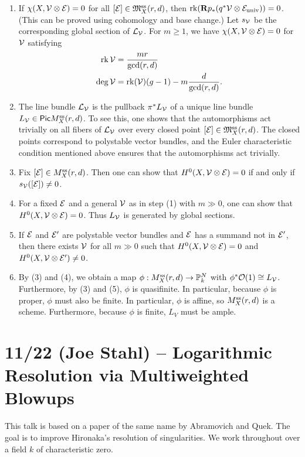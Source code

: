 \documentclass{amsart}
\begin{document}
\begin{enumerate}
	\item If $\chi(X, \mathcal{V} \otimes \mathcal{E}) = 0$ for all $[\mathcal{E}] \in \mathfrak{M}_X^{\mathrm{ss}}(r, d)$, then $\operatorname{rk} (\mathbf{R} p_* (q^* \mathcal{V} \otimes \mathcal{E}_{\mathrm{univ}})) = 0$.
		(This can be proved using cohomology and base change.)
		Let $s_{\mathcal{V}}$ be the corresponding global section of $\mathcal{L}_{\mathcal{V}}$.
		For $m \geq 1$, we have $\chi(X, \mathcal{V} \otimes \mathcal{E}) = 0$ for $\mathcal{V}$ satisfying
		\begin{align*}
			\operatorname{rk} \mathcal{V} &= \frac{m r}{\gcd(r, d)} \\
			\deg \mathcal{V} &= \operatorname{rk}(\mathcal{V}) (g - 1) - m \frac{d}{\gcd(r, d)}.
		\end{align*}
	\item The line bundle $\mathcal{L}_{\mathcal{V}}$ is the pullback $\pi^* L_{\mathcal{V}}$ of a unique line bundle $L_{\mathcal{V}} \in \mathsf{Pic} M_X^{\mathrm{ss}}(r, d)$.
		To see this, one shows that the automorphisms act trivially on all fibers of $\mathcal{L}_{\mathcal{V}}$ over every closed point $[\mathcal{E}] \in \mathfrak{M}_X^{\mathrm{ss}}(r, d)$.
		The closed points correspond to polystable vector bundles, and the Euler characteristic condition mentioned above ensures that the automorphisms act trivially.
	\item Fix $[\mathcal{E}] \in M_X^{\mathrm{ss}}(r, d)$.
		Then one can show that $H^0(X, \mathcal{V} \otimes \mathcal{E}) = 0$ if and only if $s_{\mathcal{V}}([\mathcal{E}]) \neq 0$.
	\item For a fixed $\mathcal{E}$ and a general $\mathcal{V}$ as in step (1) with $m \gg 0$, one can show that $H^0(X, \mathcal{V} \otimes \mathcal{E}) = 0$.
		Thus $L_{\mathcal{V}}$ is generated by global sections.
	\item If $\mathcal{E}$ and $\mathcal{E}'$ are polystable vector bundles and $\mathcal{E}$ has a summand not in $\mathcal{E}'$, then there exists $\mathcal{V}$ for all $m \gg 0$ such that $H^0(X, \mathcal{V} \otimes \mathcal{E}) = 0$ and $H^0(X, \mathcal{V} \otimes \mathcal{E}') \neq 0$.
	\item By (3) and (4), we obtain a map $\phi: M_X^{\mathrm{ss}}(r, d) \to \mathbb{P}_k^N$ with $\phi^* \mathcal{O}(1) \cong L_{\mathcal{V}}$.
		Furthermore, by (3) and (5), $\phi$ is quasifinite.
		In particular, because $\phi$ is proper, $\phi$ must also be finite.
		In particular, $\phi$ is affine, so $M_X^{\mathrm{ss}}(r, d)$ is a scheme.
		Furthermore, because $\phi$ is finite, $L_V$ must be ample.
\end{enumerate}

\section{11/22 (Joe Stahl) -- Logarithmic Resolution via Multiweighted Blowups}

This talk is based on a paper of the same name by Abramovich and Quek.
The goal is to improve Hironaka's resolution of singularities.
We work throughout over a field $k$ of characteristic zero.
\end{document}
